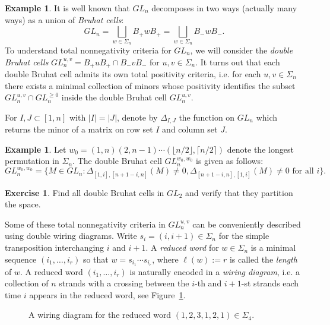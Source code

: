 \documentclass{amsart}
\theoremstyle{definition}
\newtheorem{example}[theorem]{Example}
\newtheorem{subexample}{Example}[theorem]
\newtheorem{subexercise}{Exercise}[theorem]
\theoremstyle{remark}
\numberwithin{equation}{section}
\begin{document}
\begin{example}
    It is well known that $GL_n$ decomposes in two ways (actually many ways) as a union of \emph{Bruhat cells}:
    \[GL_n=\bigsqcup_{w\in\Sigma_n}B_+w B_+=\bigsqcup_{w\in\Sigma_n}B_-w B_-.\]
    To understand total nonnegativity criteria for $GL_n$, we will consider the \emph{double Bruhat cells} $GL_n^{u,v}=B_+uB_+\cap B_-vB_-$ for $u,v\in\Sigma_n$.  It turns out that each double Bruhat cell admits its own total positivity criteria, i.e. for each $u,v\in\Sigma_n$ there exists a minimal collection of minors whose positivity identifies the subset $GL_n^{u,v}\cap GL_n^{\ge0}$ inside the double Bruhat cell $GL_n^{u,v}$.

    For $I,J\subset[1,n]$ with $|I|=|J|$, denote by $\Delta_{I,J}$ the function on $GL_n$ which returns the minor of a matrix on row set $I$ and column set $J$.
    \setcounter{subexample}{1}
    \begin{subexample}\label{example:big cell}
      Let $w_0=(1,n)(2,n-1)\cdots(\lfloor n/2\rfloor,\lceil n/2\rceil)$ denote the longest permutation in $\Sigma_n$.  The double Bruhat cell $GL_n^{w_0,w_0}$ is given as follows:
      \[GL_n^{w_0,w_0}=\{M\in GL_n:\Delta_{[1,i],[n+1-i,n]}(M)\ne0,\Delta_{[n+1-i,n],[1,i]}(M)\ne0\text{ for all $i$}\}.\]
    \end{subexample}
    \setcounter{subexercise}{2}
    \begin{subexercise}
      Find all double Bruhat cells in $GL_2$ and verify that they partition the space.
    \end{subexercise}

    Some of these total nonnegativity criteria in $GL_n^{u,v}$ can be conveniently described using double wiring diagrams.  Write $s_i=(i,i+1)\in\Sigma_n$ for the simple transposition interchanging $i$ and $i+1$.  A \emph{reduced word} for $w\in\Sigma_n$ is a minimal sequence $(i_1,\ldots,i_r)$ so that $w=s_{i_1}\cdots s_{i_r}$, where $\ell(w):=r$ is called the \emph{length} of $w$.  A reduced word $(i_1,\ldots,i_r)$ is naturally encoded in a \emph{wiring diagram}, i.e. a collection of $n$ strands with a crossing between the $i$-th and $i+1$-st strands each time $i$ appears in the reduced word, see Figure~\ref{fig:wiring diagram}.
    \begin{figure}[h]
    \caption{A wiring diagram for the reduced word $(1,2,3,1,2,1)\in\Sigma_4$.}
    \label{fig:wiring diagram}
    \end{figure}


\end{example}
\end{document}
